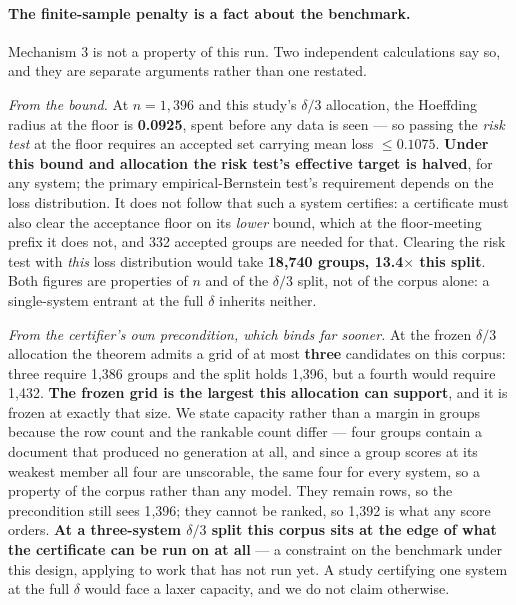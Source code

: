 \documentclass[11pt]{article}
\begin{document}
\paragraph{The finite-sample penalty is a fact about the benchmark.} Mechanism 3 is not a property of this run. Two independent calculations say so, and
they are separate arguments rather than one restated.

\emph{From the bound.} At $n = 1{,}396$ and this study's $\delta/3$ allocation, the Hoeffding
radius at the floor is \textbf{0.0925}, spent before any data is seen --- so passing the
\emph{risk test} at the floor requires an accepted set carrying mean loss $\leq \mathbf{0.1075}$.
\textbf{Under this bound and allocation the risk test's effective target is halved}, for any
system; the primary empirical-Bernstein test's requirement depends on the loss distribution. It does
not follow that such a system certifies: a certificate must also clear the acceptance floor on its
\emph{lower} bound, which at the floor-meeting prefix it does not, and 332 accepted groups are
needed for that. Clearing the risk test with \emph{this} loss distribution would take
\textbf{18{,}740 groups, 13.4$\times$ this split}. Both figures are properties of $n$ and of the
$\delta/3$ split, not of the corpus alone: a single-system entrant at the full $\delta$ inherits
neither.

\emph{From the certifier's own precondition, which binds far sooner.} At the frozen $\delta/3$
allocation the theorem admits a grid of at most \textbf{three} candidates on this corpus: three
require 1{,}386 groups and the split holds 1{,}396, but a fourth would require 1{,}432. \textbf{The
frozen grid is the largest this allocation can support}, and it is frozen at exactly that size. We
state capacity rather than a margin in groups because the row count and the rankable count differ
--- four groups contain a document that produced no generation at all, and since a group scores at
its weakest member all four are unscorable, the same four for every system, so a property of the
corpus rather than any model. They remain rows, so the precondition still sees 1{,}396; they cannot
be ranked, so 1{,}392 is what any score orders. \textbf{At a three-system $\delta/3$ split this
corpus sits at the edge of what the certificate can be run on at all} --- a constraint on the
benchmark under this design, applying to work that has not run yet. A study certifying one system
at the full $\delta$ would face a laxer capacity, and we do not claim otherwise.
\end{document}
